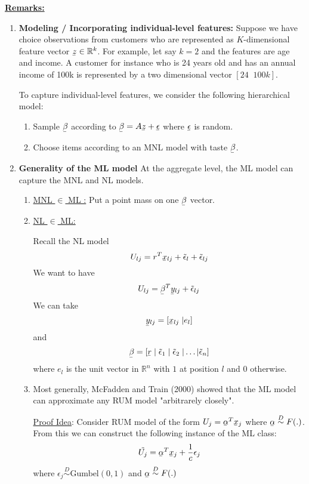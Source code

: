 \documentclass[11pt]{article}
\newcommand{\ubar}[1]{\underaccent{\bar}{#1}}
\begin{document}
\underline{\bf Remarks:}
\begin{enumerate}
\item {\bf Modeling / Incorporating individual-level features:}
Suppose we have choice observations from customers who are represented as $K$-dimensional feature vector $ \ubar z \in \mathbb{R}^k$. For example, let say $k=2$ and the features are age and income. A customer for instance who is 24 years old and has an annual income of 100k is represented by a two dimensional vector $[24 \; \; 100k]$. 

To capture individual-level features, we consider the following hierarchical model:
\begin{enumerate}
\item Sample $\ubar \beta $ according to $ \ubar \beta = A \ubar z + \ubar \epsilon$ where  $\ubar \epsilon$ is random.
\item Choose items according to an MNL model with taste $ \ubar \beta$.
\end{enumerate}

\item {\bf Generality of the ML model}
At the aggregate level, the ML model can capture the MNL and NL models. 
\begin{enumerate}
\item  \underline{MNL $ \in$ ML :} Put a point mass on one $\ubar \beta$ vector.
\item \underline{NL $ \in $ ML:} 

Recall the NL model
$$ U_{lj} = r^T \ubar x_{lj} + \tilde{\epsilon}_l +  \tilde{\epsilon}_{lj}$$ We want to have
$$ U_{lj} = \ubar \beta ^T \ubar y_{lj} +   \tilde{\epsilon}_{lj}$$
We can take $$ \ubar y_{lj} = [ \ubar x_{lj}  \; \vert  e_l ] $$ and
$$ \ubar \beta = [ \ubar r \; \vert \; \tilde{\epsilon}_1 \; \vert \; \tilde{\epsilon}_2 \; \vert  \ldots \vert \tilde{\epsilon}_n  ]$$
where $ e_l$ is the unit vector in $\mathbb{R}^n$ with $1$ at position $l$ and $0$ otherwise.

\item Most generally, McFadden and Train (2000) showed that the ML model can approximate any RUM model "arbitrarely closely".

\underline{ Proof Idea}: Consider RUM model of the form $ U_j = \ubar \alpha ^T \ubar x_j$ where $ \ubar \alpha \overset{D}{\sim} F(.)$. From this we can construct the following instance of the ML class:
$$ \tilde{U_j} = \ubar \alpha^T \ubar x_j + \frac{1}{c} \epsilon_j $$
where $ {\epsilon}_j \overset{D}{\sim} \text{Gumbel}(0,1)$  and $ \ubar{\alpha } \overset{D}{\sim} F(.) $
\end{enumerate}


\end{enumerate}
\end{document}
